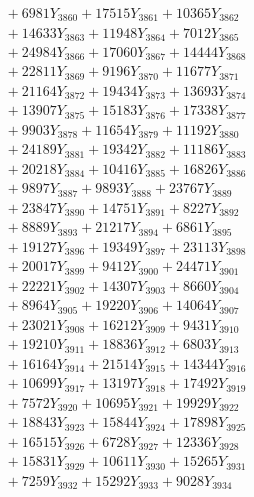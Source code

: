\documentclass[a4paper,10pt]{article}
\begin{document}
{\begin{align}
&\;  + 6981 Y_{3860} + 17515 Y_{3861} + 10365 Y_{3862} \\[0.3ex]
&\;  + 14633 Y_{3863} + 11948 Y_{3864} + 7012 Y_{3865} \\[0.3ex]
&\;  + 24984 Y_{3866} + 17060 Y_{3867} + 14444 Y_{3868} \\[0.5ex]\allowbreak
&\;  + 22811 Y_{3869} + 9196 Y_{3870} + 11677 Y_{3871} \\[0.3ex]
&\;  + 21164 Y_{3872} + 19434 Y_{3873} + 13693 Y_{3874} \\[0.3ex]
&\;  + 13907 Y_{3875} + 15183 Y_{3876} + 17338 Y_{3877} \\[0.3ex]
&\;  + 9903 Y_{3878} + 11654 Y_{3879} + 11192 Y_{3880} \\[0.3ex]
&\;  + 24189 Y_{3881} + 19342 Y_{3882} + 11186 Y_{3883} \\[0.3ex]
&\;  + 20218 Y_{3884} + 10416 Y_{3885} + 16826 Y_{3886} \\[0.3ex]
&\;  + 9897 Y_{3887} + 9893 Y_{3888} + 23767 Y_{3889} \\[0.3ex]
&\;  + 23847 Y_{3890} + 14751 Y_{3891} + 8227 Y_{3892} \\[0.3ex]
&\;  + 8889 Y_{3893} + 21217 Y_{3894} + 6861 Y_{3895} \\[0.3ex]
&\;  + 19127 Y_{3896} + 19349 Y_{3897} + 23113 Y_{3898} \\[0.5ex]\allowbreak
&\;  + 20017 Y_{3899} + 9412 Y_{3900} + 24471 Y_{3901} \\[0.3ex]
&\;  + 22221 Y_{3902} + 14307 Y_{3903} + 8660 Y_{3904} \\[0.3ex]
&\;  + 8964 Y_{3905} + 19220 Y_{3906} + 14064 Y_{3907} \\[0.3ex]
&\;  + 23021 Y_{3908} + 16212 Y_{3909} + 9431 Y_{3910} \\[0.3ex]
&\;  + 19210 Y_{3911} + 18836 Y_{3912} + 6803 Y_{3913} \\[0.3ex]
&\;  + 16164 Y_{3914} + 21514 Y_{3915} + 14344 Y_{3916} \\[0.3ex]
&\;  + 10699 Y_{3917} + 13197 Y_{3918} + 17492 Y_{3919} \\[0.3ex]
&\;  + 7572 Y_{3920} + 10695 Y_{3921} + 19929 Y_{3922} \\[0.3ex]
&\;  + 18843 Y_{3923} + 15844 Y_{3924} + 17898 Y_{3925} \\[0.3ex]
&\;  + 16515 Y_{3926} + 6728 Y_{3927} + 12336 Y_{3928} \\[0.5ex]\allowbreak
&\;  + 15831 Y_{3929} + 10611 Y_{3930} + 15265 Y_{3931} \\[0.3ex]
&\;  + 7259 Y_{3932} + 15292 Y_{3933} + 9028 Y_{3934} \\[0.3ex]

\end{align}}
\end{document}
